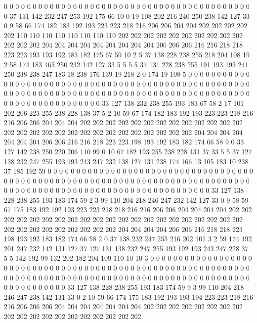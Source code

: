 0 0 0 0 0 0 0 0 0 0 0 0 0 0 0 0 0 0 0 0
0 0 0 0 0 0 0 0 0 0 0 0 0 0 0 0 0 0 0 0
0 0 0 0 37 131 142 232 247 253 192 175 66 10 0 19 108 202 216 240
250 238 142 127 33 0 9 58 66 174 182 183 192 193 223 223 218 216 206 206
204 204 202 202 202 202 202 110 110 110 110 110 110 110 110 202 202 202 202 202
202 202 202 202 202 202 202 202 204 204 204 204 204 204 204 204 204 206 206 206
216 216 218 218 223 223 193 193 192 183 182 175 67 59 10 2 5 37 138 228
238 255 218 204 108 19 2 58 174 183 165 250 232 142 127 33 5 5 5 5
37 131 228 238 255 191 193 193 241 250 238 238 247 183 18 238 176 139 19 218
2 0 174 19 108 5 0 0 0 0 0 0 0 0 0 0 0 0 0 0
0 0 0 0 0 0 0 0 0 0 0 0 0 0 0 0 0 0 0 0
0 0 0 0 0 0 0 0 0 0 0 0 0 0 0 0 0 0 0 0
0 0 0 0 0 0 0 0 0 0 0 0 0 0 0 0 0 0 0 0
0 0 0 0 0 0 0 0 0 0 0 0 0 0 0 0 0 0 0 0
0 0 0 0 0 0 0 0 0 0 0 0 0 0 0 0 0 0 0 0
33 127 138 232 238 255 193 183 67 58 2 17 101 202 206 223 255 238 228 138
37 5 2 10 59 67 174 182 183 192 193 223 223 218 216 216 206 206 204 204
204 202 202 202 202 202 202 202 202 202 202 202 202 202 202 202 202 202 202 202
202 202 202 202 202 202 202 202 202 204 204 204 204 204 204 204 206 206 216 216
218 223 223 198 193 192 183 182 174 66 58 9 0 33 127 142 238 250 220 206
110 99 0 10 67 182 193 255 238 228 131 37 33 5 5 37 127 138 232 247
255 193 193 243 247 232 138 127 131 238 174 166 13 105 183 10 238 37 185 192
59 0 0 0 0 0 0 0 0 0 0 0 0 0 0 0 0 0 0 0
0 0 0 0 0 0 0 0 0 0 0 0 0 0 0 0 0 0 0 0
0 0 0 0 0 0 0 0 0 0 0 0 0 0 0 0 0 0 0 0
0 0 0 0 0 0 0 0 0 0 0 0 0 0 0 0 0 0 0 0
0 0 0 0 0 0 0 0 0 0 0 0 0 0 0 0 0 0 0 0
0 0 0 0 0 0 0 0 0 0 0 0 0 0 0 0 33 127 138 228
238 255 193 183 174 59 2 3 99 110 204 218 246 247 232 142 127 33 0 9
58 59 67 175 183 192 192 193 223 223 218 218 216 216 206 206 204 204 204 204
202 202 202 202 202 202 202 202 202 202 202 202 202 202 202 202 202 202 202 202
202 202 202 202 202 202 202 202 202 202 204 204 204 204 206 206 216 218 218 223
198 193 192 183 182 174 66 58 2 0 37 138 232 247 255 216 202 101 3 2
59 174 192 201 247 232 142 131 127 37 127 131 138 232 247 255 193 192 193 243
247 228 37 5 5 142 192 99 132 202 182 204 109 110 10 10 3 0 0 0
0 0 0 0 0 0 0 0 0 0 0 0 0 0 0 0 0 0 0 0
0 0 0 0 0 0 0 0 0 0 0 0 0 0 0 0 0 0 0 0
0 0 0 0 0 0 0 0 0 0 0 0 0 0 0 0 0 0 0 0
0 0 0 0 0 0 0 0 0 0 0 0 0 0 0 0 0 0 0 0
0 0 0 0 0 0 0 0 0 0 0 0 0 0 0 0 0 0 0 0
0 0 0 0 0 0 0 0 0 0 0 0 33 127 138 228 238 255 193 183
174 59 9 3 99 110 204 218 246 247 238 142 131 33 0 2 10 59 66 174
175 183 192 193 193 194 223 223 218 216 216 206 206 206 204 204 204 204 204 204
204 202 202 202 202 202 202 202 202 202 202 202 202 202 202 202 202 202 202 202
